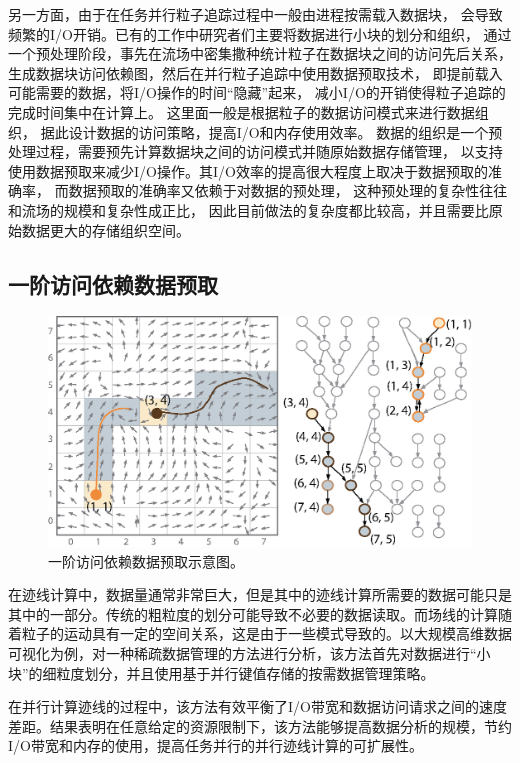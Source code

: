 另一方面，由于在任务并行粒子追踪过程中一般由进程按需载入数据块，
会导致频繁的I/O开销。已有的工作\parencite{ChenXLS12,ChenNLS12}中研究者们主要将数据进行小块的划分和组织，
通过一个预处理阶段，事先在流场中密集撒种统计粒子在数据块之间的访问先后关系，
生成数据块访问依赖图，然后在并行粒子追踪中使用数据预取技术，
即提前载入可能需要的数据，将I/O操作的时间“隐藏”起来，
减小I/O的开销使得粒子追踪的完成时间集中在计算上。
这里面一般是根据粒子的数据访问模式来进行数据组织，
据此设计数据的访问策略，提高I/O和内存使用效率。
数据的组织是一个预处理过程，需要预先计算数据块之间的访问模式并随原始数据存储管理，
以支持使用数据预取来减少I/O操作。其I/O效率的提高很大程度上取决于数据预取的准确率，
而数据预取的准确率又依赖于对数据的预处理，
这种预处理的复杂性往往和流场的规模和复杂性成正比，
因此目前做法的复杂度都比较高，并且需要比原始数据更大的存储组织空间。

\subsection{一阶访问依赖数据预取}

\begin{figure}[!tb]
  \centering
  \includegraphics[width=.75\linewidth]{image/prefetch/sparse}
  \caption{
    一阶访问依赖数据预取示意图\parencite{GuoZLLYHMP14}。
  }
  \label{fig:background:sparse}
\end{figure}

在迹线计算中，数据量通常非常巨大，但是其中的迹线计算所需要的数据可能只是其中的一部分。传统的粗粒度的划分可能导致不必要的数据读取。而场线的计算随着粒子的运动具有一定的空间关系，这是由于一些模式导致的。以大规模高维数据可视化为例，对一种稀疏数据管理的方法\cite{guo2014advection}进行分析，该方法首先对数据进行“小块”的细粒度划分，并且使用基于并行键值存储的按需数据管理策略。

在并行计算迹线的过程中，该方法有效平衡了I/O带宽和数据访问请求之间的速度差距。结果表明在任意给定的资源限制下，该方法能够提高数据分析的规模，节约I/O带宽和内存的使用，提高任务并行的并行迹线计算的可扩展性。

